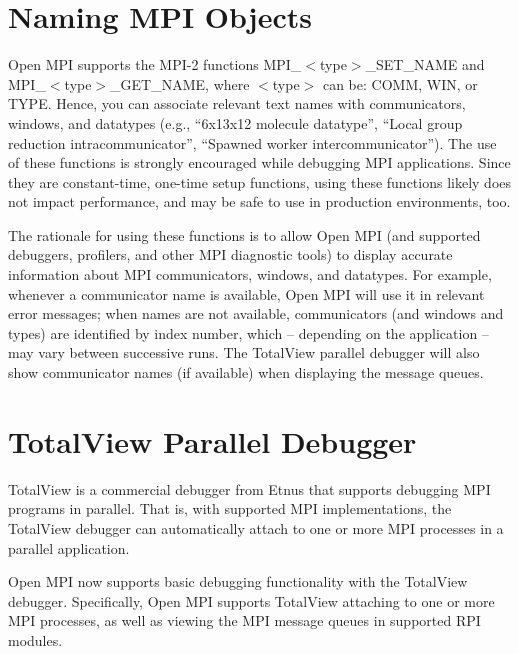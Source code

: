 \section{Naming MPI Objects}

Open MPI supports the MPI-2 functions {\sf
  MPI\_\-$<$type$>$\_\-SET\_\-NAME} and {\sf
  MPI\_\-$<$type$>$\_\-GET\_\-NAME}, where {\sf $<$type$>$} can be:
{\sf COMM}, {\sf WIN}, or {\sf TYPE}.  Hence, you can associate
relevant text names with communicators, windows, and datatypes (e.g.,
``6x13x12 molecule datatype'', ``Local group reduction
intracommunicator'', ``Spawned worker intercommunicator'').  The use
of these functions is strongly encouraged while debugging MPI
applications.  Since they are constant-time, one-time setup functions,
using these functions likely does not impact performance, and may be
safe to use in production environments, too.

The rationale for using these functions is to allow Open MPI (and
supported debuggers, profilers, and other MPI diagnostic tools) to
display accurate information about MPI communicators, windows, and
datatypes.  For example, whenever a communicator name is available,
Open MPI will use it in relevant error messages; when names are not
available, communicators (and windows and types) are identified by
index number, which -- depending on the application -- may vary
between successive runs.  The TotalView parallel debugger will also
show communicator names (if available) when displaying the message
queues.


\section{TotalView Parallel Debugger}
\label{sec:debug-totalview}

TotalView is a commercial debugger from Etnus that supports debugging
MPI programs in parallel.  That is, with supported MPI
implementations, the TotalView debugger can automatically attach to
one or more MPI processes in a parallel application.

Open MPI now supports basic debugging functionality with the TotalView
debugger.  Specifically, Open MPI supports TotalView attaching to one
or more MPI processes, as well as viewing the MPI message queues in
supported RPI modules.

